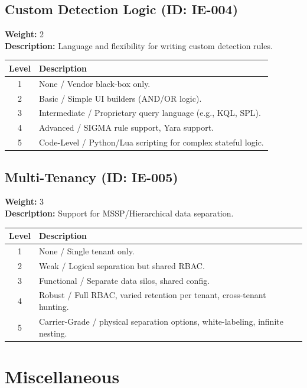 \documentclass{article}
\begin{document}
\subsection{Custom Detection Logic (ID: IE-004)}
\textbf{Weight:} 2 \\
\textbf{Description:} Language and flexibility for writing custom detection rules.
\vspace{0.3cm}
\begin{longtable}{|c|p{12cm}|}
\hline
\rowcolor{lightgray} \textbf{Level} & \textbf{Description} \\ \hline
1 & None / Vendor black-box only. \\ \hline
2 & Basic / Simple UI builders (AND/OR logic). \\ \hline
3 & Intermediate / Proprietary query language (e.g., KQL, SPL). \\ \hline
4 & Advanced / SIGMA rule support, Yara support. \\ \hline
5 & Code-Level / Python/Lua scripting for complex stateful logic. \\ \hline
\end{longtable}
\vspace{0.5cm}
\subsection{Multi-Tenancy (ID: IE-005)}
\textbf{Weight:} 3 \\
\textbf{Description:} Support for MSSP/Hierarchical data separation.
\vspace{0.3cm}
\begin{longtable}{|c|p{12cm}|}
\hline
\rowcolor{lightgray} \textbf{Level} & \textbf{Description} \\ \hline
1 & None / Single tenant only. \\ \hline
2 & Weak / Logical separation but shared RBAC. \\ \hline
3 & Functional / Separate data silos, shared config. \\ \hline
4 & Robust / Full RBAC, varied retention per tenant, cross-tenant hunting. \\ \hline
5 & Carrier-Grade / physical separation options, white-labeling, infinite nesting. \\ \hline
\end{longtable}
\vspace{0.5cm}
\section{Miscellaneous}
\end{document}

